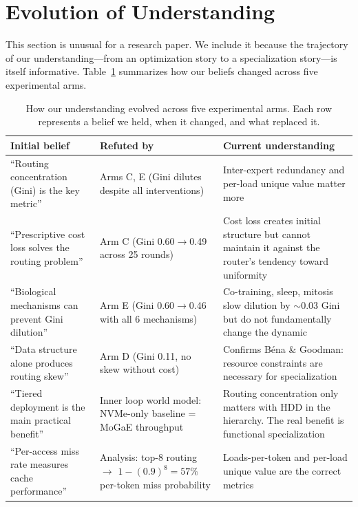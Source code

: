 \documentclass{article}
\begin{document}
\section{Evolution of Understanding}

This section is unusual for a research paper. We include it because the trajectory of our understanding---from an optimization story to a specialization story---is itself informative. Table~\ref{tab:evolution} summarizes how our beliefs changed across five experimental arms.

\begin{table}[h]
\centering
\caption{How our understanding evolved across five experimental arms. Each row represents a belief we held, when it changed, and what replaced it.}
\label{tab:evolution}
\begin{tabular}{@{}p{4cm}p{3cm}p{5cm}@{}}
\toprule
Initial belief & Refuted by & Current understanding \\
\midrule
``Routing concentration (Gini) is the key metric'' & Arms C, E (Gini dilutes despite all interventions) & Inter-expert redundancy and per-load unique value matter more \\
\addlinespace
``Prescriptive cost loss solves the routing problem'' & Arm C (Gini 0.60$\to$0.49 across 25 rounds) & Cost loss creates initial structure but cannot maintain it against the router's tendency toward uniformity \\
\addlinespace
``Biological mechanisms can prevent Gini dilution'' & Arm E (Gini 0.60$\to$0.46 with all 6 mechanisms) & Co-training, sleep, mitosis slow dilution by $\sim$0.03 Gini but do not fundamentally change the dynamic \\
\addlinespace
``Data structure alone produces routing skew'' & Arm D (Gini 0.11, no skew without cost) & Confirms Béna \& Goodman: resource constraints are necessary for specialization \\
\addlinespace
``Tiered deployment is the main practical benefit'' & Inner loop world model: NVMe-only baseline = MoGaE throughput & Routing concentration only matters with HDD in the hierarchy. The real benefit is functional specialization \\
\addlinespace
``Per-access miss rate measures cache performance'' & Analysis: top-8 routing $\to$ $1{-}(0.9)^8{=}57\%$ per-token miss probability & Loads-per-token and per-load unique value are the correct metrics \\
\bottomrule
\end{tabular}
\end{table}
\end{document}

